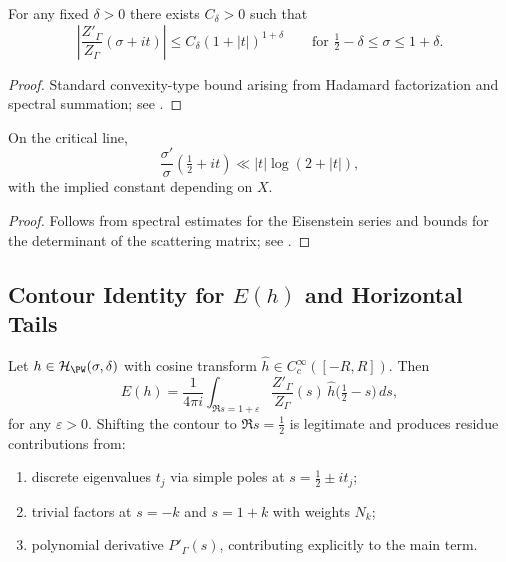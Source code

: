 \begin{lemma} \label{lem:vertical-strip} %
For any fixed \(\delta>0\) there exists \(C_\delta>0\) such that
\[
  \left|\frac{Z'_\Gamma}{Z_\Gamma}(\sigma+it)\right|
   \le C_\delta (1+|t|)^{1+\delta}
   \qquad \text{for } \tfrac12-\delta\le \sigma\le 1+\delta.
\]
\end{lemma}

\begin{proof}
Standard convexity-type bound arising from Hadamard factorization and spectral summation; see \cite{HejhalII}. %
\end{proof}

\begin{lemma} \label{lem:GrowthSigma} %
On the critical line,
\[
  \frac{\sigma'}{\sigma}\!\left(\tfrac12+it\right)
  \ll |t|\log(2+|t|),
\]
with the implied constant depending on \(X\). %
\end{lemma}

\begin{proof}
Follows from spectral estimates for the Eisenstein series and bounds for the determinant of the scattering matrix; see \cite{Iwaniec,Borthwick}. %
\end{proof}

\subsection{Contour Identity for \(E(h)\) and Horizontal Tails} \label{subsec:contour-identity} \relax \hspace{0pt} %

\begin{theorem} \label{thm:ContourIdentity} %
Let \(h\in\mathcal H_{\PW}(\sigma,\delta)\) with cosine transform \(\widehat h\in C_c^\infty([-R,R])\). Then
\begin{equation}\label{eq:Contour-Eh}
  E(h)
  = \frac{1}{4\pi i}\int_{\Re s=1+\varepsilon}
      \frac{Z'_\Gamma}{Z_\Gamma}(s)\,
      \widehat h\!\Big(\tfrac12-s\Big)\,ds,
\end{equation}
for any \(\varepsilon>0\). Shifting the contour to \(\Re s=\tfrac12\) is legitimate and produces residue contributions from: %
\begin{enumerate}[label=(\roman*),itemsep=2pt]
  \item discrete eigenvalues \(t_j\) via simple poles at \(s=\tfrac12\pm it_j\); %
  \item trivial factors at \(s=-k\) and \(s=1+k\) with weights \(N_k\); %
  \item polynomial derivative \(P'_\Gamma(s)\), contributing explicitly to the main term. %
\end{enumerate}
\end{theorem}

